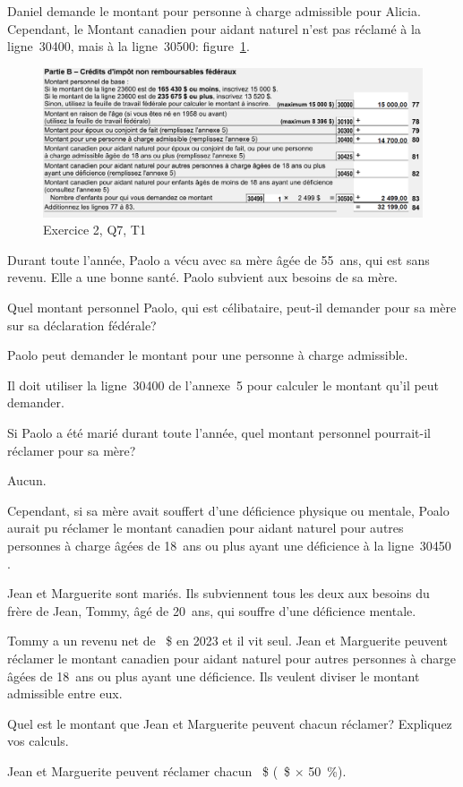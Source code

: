 Daniel demande le montant pour personne à charge admissible pour Alicia. Cependant, le Montant canadien pour aidant naturel n'est pas réclamé à la ligne~30400, mais à la ligne~30500: figure~\ref{fig:chap4Exercice2Q7T1}.
\begin{figure}
	\centering
	\includegraphics[width=.9\textwidth]{exercice/4-2/Q7/T1.png}
	\caption{Exercice 2, Q7, T1}
	\label{fig:chap4Exercice2Q7T1}
\end{figure}

\begin{question}
	Durant toute l'année, Paolo a vécu avec sa mère âgée de 55~ans, qui est sans revenu. Elle a une bonne santé. Paolo subvient aux besoins de sa mère.
\end{question}
\setcounter{sousQuestion}{0}
\begin{sousQuestion}
	Quel montant personnel Paolo, qui est célibataire, peut-il demander pour sa mère sur sa déclaration fédérale?
\end{sousQuestion}
Paolo peut demander le montant pour une personne à charge admissible.

Il doit utiliser la ligne~30400 de l'annexe~5 pour calculer le montant qu'il peut demander.

\begin{sousQuestion}
	Si Paolo a été marié durant toute l'année, quel montant personnel pourrait-il réclamer pour sa mère?
\end{sousQuestion}
Aucun.

Cependant, si sa mère avait souffert d'une déficience physique ou mentale, Poalo aurait pu réclamer le montant canadien pour aidant naturel pour autres personnes à charge âgées de 18~ans ou plus ayant une déficience à la ligne~30450 .

\begin{question}
	Jean et Marguerite sont mariés. Ils subviennent tous les deux aux besoins du frère de Jean, Tommy, âgé de 20~ans, qui souffre d'une déficience mentale. 
	
	Tommy a un revenu net de ~\$ en 2023 et il vit seul. Jean et Marguerite peuvent réclamer le montant canadien pour aidant naturel pour autres personnes à charge âgées de 18~ans ou plus ayant une déficience. Ils veulent diviser le montant admissible entre eux. 
	
	Quel est le montant que Jean et Marguerite peuvent chacun réclamer? Expliquez vos calculs.
\end{question}
Jean et Marguerite peuvent réclamer chacun ~\$ (~\$ $\times$ 50~\%).

